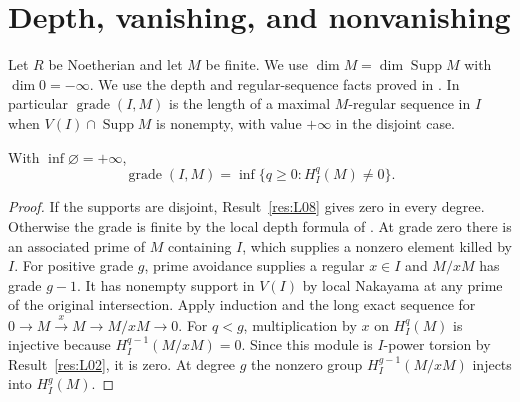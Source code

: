 \chapter{Depth, vanishing, and nonvanishing}
\label{ch:depth-and-vanishing}

Let \(R\) be Noetherian and let \(M\) be finite. We use
\(\dim M=\dim\operatorname{Supp} M\) with \(\dim 0=-\infty\).
We use the depth and regular-sequence facts proved in
\cite[DP-01, DP-04--DP-06, CM-01--CM-04]{core}. In particular
\(\operatorname{grade}(I,M)\) is the length of a maximal
\(M\)-regular sequence in \(I\) when \(V(I)\cap\operatorname{Supp}M\)
is nonempty, with value \(+\infty\) in the disjoint case.

\begin{theorem}\label{res:V01}
With \(\inf\varnothing=+\infty\),
\[
 \operatorname{grade}(I,M)=\inf\{q\geq0:H_I^q(M)\ne0\}.
\]
\end{theorem}
\begin{proof}
If the supports are disjoint, Result~\ref{res:L08} gives zero in every
degree. Otherwise the grade is finite by the local depth formula of
\cite[DP-06]{core}. At grade zero there is an associated prime of \(M\)
containing \(I\), which supplies a nonzero element killed by \(I\).
For positive grade \(g\), prime avoidance supplies a regular
\(x\in I\) and \(M/xM\) has grade \(g-1\). It has nonempty support
in \(V(I)\) by local Nakayama at any prime of the original intersection.
Apply induction and the long exact sequence for
\(0\to M\xrightarrow{x}M\to M/xM\to0\).
For \(q<g\), multiplication by \(x\) on \(H_I^q(M)\) is injective
because \(H_I^{q-1}(M/xM)=0\). Since this module is \(I\)-power
torsion by Result~\ref{res:L02}, it is zero. At degree \(g\) the
nonzero group \(H_I^{g-1}(M/xM)\) injects into \(H_I^g(M)\).
\end{proof}

